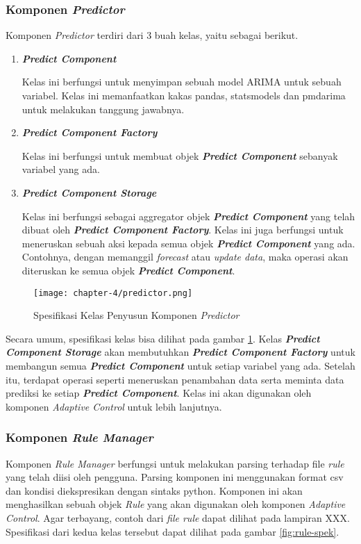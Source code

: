 \subsubsection{Komponen \textit{Predictor}}
Komponen \textit{Predictor} terdiri dari 3 buah kelas, yaitu sebagai berikut.
\begin{enumerate}
    \item \textbf{\textit{Predict Component}}
    
    Kelas ini berfungsi untuk menyimpan sebuah model ARIMA untuk sebuah variabel. Kelas ini memanfaatkan kakas pandas, statsmodels dan pmdarima untuk melakukan tanggung jawabnya.

    \item \textbf{\textit{Predict Component Factory}}
    
    Kelas ini berfungsi untuk membuat objek \textbf{\textit{Predict Component}} sebanyak variabel yang ada. 

    \item \textbf{\textit{Predict Component Storage}}
    
    Kelas ini berfungsi sebagai aggregator objek \textbf{\textit{Predict Component}} yang telah dibuat oleh \textbf{\textit{Predict Component Factory}}. Kelas ini juga berfungsi untuk meneruskan sebuah aksi kepada semua objek \textbf{\textit{Predict Component}} yang ada. Contohnya, dengan memanggil \textit{forecast} atau \textit{update data}, maka operasi akan diteruskan ke semua objek \textbf{\textit{Predict Component}}.

\end{enumerate}

\begin{figure}[h]
    \centering
    \texttt{[image: chapter-4/predictor.png]}
    \caption{Spesifikasi Kelas Penyusun Komponen \textit{Predictor}}
    \label{fig:predictor-spek}
\end{figure}

Secara umum, spesifikasi kelas bisa dilihat pada gambar \ref{fig:predictor-spek}. Kelas \textbf{\textit{Predict Component Storage}} akan membutuhkan \textbf{\textit{Predict Component Factory}} untuk membangun semua \textbf{\textit{Predict Component}} untuk setiap variabel yang ada. Setelah itu, terdapat operasi seperti meneruskan penambahan data serta meminta data prediksi ke setiap \textbf{\textit{Predict Component}}. Kelas ini akan digunakan oleh komponen \textit{Adaptive Control} untuk lebih lanjutnya.

\subsubsection{Komponen \textit{Rule Manager}}
Komponen \textit{Rule Manager} berfungsi untuk melakukan parsing terhadap file \textit{rule} yang telah diisi oleh pengguna. Parsing komponen ini menggunakan format csv dan kondisi diekspresikan dengan sintaks python. Komponen ini akan menghasilkan sebuah objek \textit{Rule} yang akan digunakan oleh komponen \textit{Adaptive Control}. Agar terbayang, contoh dari \textit{file rule} dapat dilihat pada lampiran XXX. Spesifikasi dari kedua kelas tersebut dapat dilihat pada gambar \ref{fig:rule-spek}.

